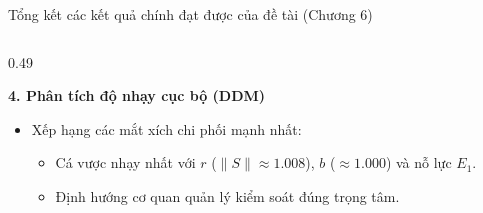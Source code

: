 \documentclass[aspectratio=169, 10pt]{beamer}
\begin{document}
\begin{frame}{Tổng kết các kết quả chính đạt được của đề tài (Chương 6)}
\begin{columns}[t]
\begin{column}{0.49\textwidth}
      \vspace{0.1cm}

      \begin{exampleblock}{\textbf{4. Phân tích độ nhạy cục bộ (DDM)}}
        \footnotesize
        \begin{itemize}
          \item Xếp hạng các mắt xích chi phối mạnh nhất:
          \begin{itemize}
            \item Cá vược nhạy nhất với $r$ ($\|S\| \approx 1.008$), $b$ ($\approx 1.000$) và nỗ lực $E_1$.
            \item Định hướng cơ quan quản lý kiểm soát đúng trọng tâm.
          \end{itemize}
        \end{itemize}
      \end{exampleblock}
    \end{column}
  \end{columns}
\end{frame}
\end{document}
